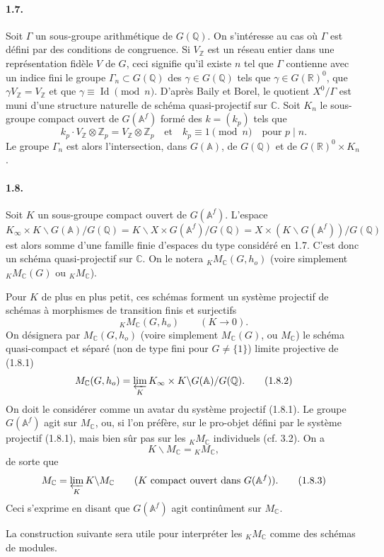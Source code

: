 \documentclass[10pt]{article}
\newcommand{\A}{\mathbb A}
\newcommand{\Af}{\mathbb A^f}
\newcommand{\C}{\mathbb C}
\newcommand{\Q}{\mathbb Q}
\newcommand{\R}{\mathbb R}
\newcommand{\Z}{\mathbb Z}
\newcommand{\id}{\operatorname{Id}}
\newcommand{\limproj}{\varprojlim}
\newcommand{\MC}{M_{\C}}
\begin{document}
\paragraph{1.7.} Soit $\Gamma$ un sous-groupe arithmétique de $G(\Q)$. On s'intéresse au cas où $\Gamma$ est défini par des conditions de congruence. Si $V_\Z$ est un réseau entier dans une représentation fidèle $V$ de $G$, ceci signifie qu'il existe $n$ tel que $\Gamma$ contienne avec un indice fini le groupe $\Gamma_n\subset G(\Q)$ des $\gamma\in G(\Q)$ tels que $\gamma\in G(\R)^0$, que $\gamma V_\Z=V_\Z$ et que $\gamma\equiv\id\pmod n$. D'après Baily et Borel, le quotient $X^0/\Gamma$ est muni d'une structure naturelle de schéma quasi-projectif sur $\C$. Soit $K_n$ le sous-groupe compact ouvert de $G(\Af)$ formé des $k=(k_p)$ tels que
\[
k_p\cdot V_\Z\otimes\Z_p=V_\Z\otimes\Z_p
\quad\text{et}\quad
k_p\equiv1\pmod n\quad\text{pour }p\mid n.
\]
Le groupe $\Gamma_n$ est alors l'intersection, dans $G(\A)$, de $G(\Q)$ et de $G(\R)^0\times K_n$.

\paragraph{1.8.} Soit $K$ un sous-groupe compact ouvert de $G(\Af)$. L'espace
\[
K_\infty\times K\backslash G(\A)/G(\Q)
=K\backslash X\times G(\Af)/G(\Q)
=X\times(K\backslash G(\Af))/G(\Q)
\]
est alors somme d'une famille finie d'espaces du type considéré en 1.7. C'est donc un schéma quasi-projectif sur $\C$. On le notera ${}_K\MC(G,h_o)$ (voire simplement ${}_K\MC(G)$ ou ${}_K\MC$).

Pour $K$ de plus en plus petit, ces schémas forment un système projectif de schémas à morphismes de transition finis et surjectifs
\[
{}_K\MC(G,h_o)\qquad(K\to0). \tag{1.8.1}
\]
On désignera par $\MC(G,h_o)$ (voire simplement $\MC(G)$, ou $\MC$) le schéma quasi-compact et séparé (non de type fini pour $G\ne\{1\}$) limite projective de (1.8.1)
\[
\MC(G,h_o)=\limproj_K K_\infty\times K\backslash G(\A)/G(\Q). \tag{1.8.2}
\]
On doit le considérer comme un avatar du système projectif (1.8.1). Le groupe $G(\Af)$ agit sur $\MC$, ou, si l'on préfère, sur le pro-objet défini par le système projectif (1.8.1), mais bien sûr pas sur les ${}_K\MC$ individuels (cf. 3.2). On a
\[
K\backslash\MC={}_K\MC,
\]
de sorte que
\[
\MC=\limproj_K K\backslash\MC\qquad(K\text{ compact ouvert dans }G(\Af)). \tag{1.8.3}
\]
Ceci s'exprime en disant que $G(\Af)$ agit continûment sur $\MC$.

La construction suivante sera utile pour interpréter les ${}_K\MC$ comme des schémas de modules.
\end{document}
